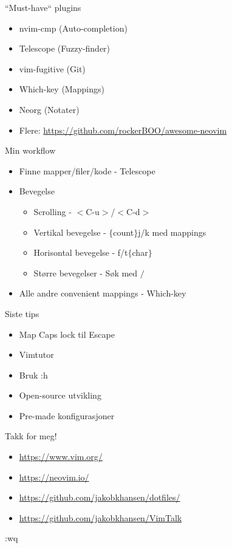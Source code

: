 \documentclass{beamer}
\begin{document}
\begin{frame}{``Must-have`` plugins}
	\begin{itemize}
		\item nvim-cmp (Auto-completion)
		\item Telescope (Fuzzy-finder)
		\item vim-fugitive (Git)
        \item Which-key (Mappings)
		\item Neorg (Notater)
        \item Flere: \url{https://github.com/rockerBOO/awesome-neovim}
	\end{itemize}
\end{frame}

\begin{frame}{Min workflow}
    \begin{itemize}
        \item Finne mapper/filer/kode - Telescope
        \item Bevegelse
            \begin{itemize}
                \item Scrolling - $<$C-u$>$/$<$C-d$>$ 
                \item Vertikal bevegelse - $\{$count$\}$j/k med mappings
                \item Horisontal bevegelse - f/t$\{$char$\}$
                \item Større bevegelser - Søk med $/$
            \end{itemize}
        \item Alle andre convenient mappings - Which-key
    \end{itemize}
\end{frame}

\begin{frame}{Siste tips}
    \begin{itemize}
        \item Map Caps lock til Escape
        \item Vimtutor
        \item Bruk :h
        \item Open-source utvikling
        \item Pre-made konfigurasjoner
    \end{itemize}
\end{frame}
\begin{frame}{Takk for meg!}
    \begin{itemize}
        \item \url{https://www.vim.org/}
        \item \url{https://neovim.io/}
        \item \url{https://github.com/jakobkhansen/dotfiles/}

        \item \url{https://github.com/jakobkhansen/VimTalk}
    \end{itemize}
    :wq
\end{frame}
\end{document}
